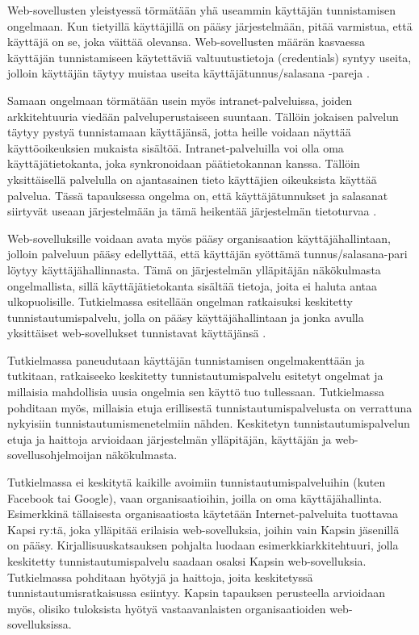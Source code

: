 Web-sovellusten yleistyessä törmätään yhä useammin käyttäjän tunnistamisen ongelmaan. Kun tietyillä käyttäjillä on pääsy järjestelmään, pitää varmistua, että käyttäjä on se, joka väittää olevansa. Web-sovellusten määrän kasvaessa käyttäjän tunnistamiseen käytettäviä valtuutustietoja (credentials) syntyy useita, jolloin käyttäjän täytyy muistaa useita käyttäjätunnus/salasana -pareja \cite{billion_keys}.

Samaan ongelmaan törmätään usein myös intranet-palveluissa, joiden arkkitehtuuria viedään palveluperustaiseen suuntaan. Tällöin jokaisen palvelun täytyy pystyä tunnistamaan käyttäjänsä, jotta heille voidaan näyttää käyttöoikeuksien mukaista sisältöä. Intranet-palveluilla voi olla oma käyttäjätietokanta, joka synkronoidaan päätietokannan kanssa. Tällöin yksittäisellä palvelulla on ajantasainen tieto käyttäjien oikeuksista käyttää palvelua. Tässä tapauksessa ongelma on, että käyttäjätunnukset ja salasanat siirtyvät useaan järjestelmään ja tämä heikentää järjestelmän tietoturvaa \cite{nisti}.

Web-sovelluksille voidaan avata myös pääsy organisaation käyttäjähallintaan, jolloin palveluun pääsy edellyttää, että käyttäjän syöttämä tunnus/salasana-pari löytyy käyttäjähallinnasta. Tämä on järjestelmän ylläpitäjän näkökulmasta ongelmallista, sillä käyttäjätietokanta sisältää tietoja, joita ei haluta antaa ulkopuolisille. Tutkielmassa esitellään ongelman ratkaisuksi keskitetty tunnistautumispalvelu, jolla on pääsy käyttäjähallintaan ja jonka avulla yksittäiset web-sovellukset tunnistavat käyttäjänsä \cite{nisti}.

Tutkielmassa paneudutaan käyttäjän tunnistamisen ongelmakenttään ja tutkitaan, ratkaiseeko keskitetty tunnistautumispalvelu esitetyt ongelmat ja millaisia mahdollisia uusia ongelmia sen käyttö tuo tullessaan. Tutkielmassa pohditaan myös, millaisia etuja erillisestä tunnistautumispalvelusta on verrattuna nykyisiin tunnistautumismenetelmiin nähden. Keskitetyn tunnistautumispalvelun etuja ja haittoja arvioidaan järjestelmän ylläpitäjän, käyttäjän ja web-sovellusohjelmoijan näkökulmasta.

Tutkielmassa ei keskitytä kaikille avoimiin tunnistautumispalveluihin (kuten Facebook tai Google), vaan organisaatioihin, joilla on oma käyttäjähallinta. Esimerkkinä tällaisesta organisaatiosta käytetään Internet-palveluita tuottavaa Kapsi ry:tä, joka ylläpitää erilaisia web-sovelluksia, joihin vain Kapsin jäsenillä on pääsy. Kirjallisuuskatsauksen pohjalta luodaan esimerkkiarkkitehtuuri, jolla keskitetty tunnistautumispalvelu saadaan osaksi Kapsin web-sovelluksia. Tutkielmassa pohditaan hyötyjä ja haittoja, joita keskitetyssä tunnistautumisratkaisussa esiintyy. Kapsin tapauksen perusteella arvioidaan myös, olisiko tuloksista hyötyä vastaavanlaisten organisaatioiden web-sovelluksissa.

